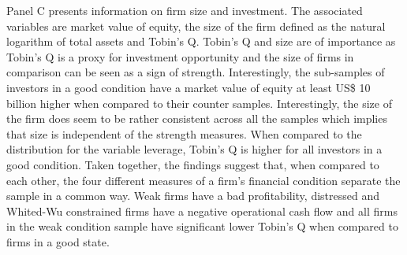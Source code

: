 \documentclass[12pt]{article}
\begin{document}
Panel C presents information on firm size and investment. The associated variables are market value of equity, the size of the firm defined as the natural logarithm of total assets and Tobin's Q. Tobin's Q and size are of importance as Tobin's Q is a proxy for investment opportunity \citep[p.957]{DUCHIN2010} and the size of firms in comparison can be seen as a sign of strength. 
Interestingly, the sub-samples of investors in a good condition have a market value of equity at least US\$ 10 billion higher when compared to their counter samples. Interestingly, the size of the firm does seem to be rather consistent across all the samples which implies that size is independent of the strength measures. When compared to the distribution for the variable leverage, Tobin's Q is higher for all investors in a good condition.
Taken together, the findings suggest that, when compared to each other, the four different measures of a firm's financial condition separate the sample in a common way. Weak firms have a bad profitability, distressed and Whited-Wu constrained firms have a negative operational cash flow and all firms in the weak condition sample have significant lower Tobin's Q when compared to firms in a good state. 
\end{document}
